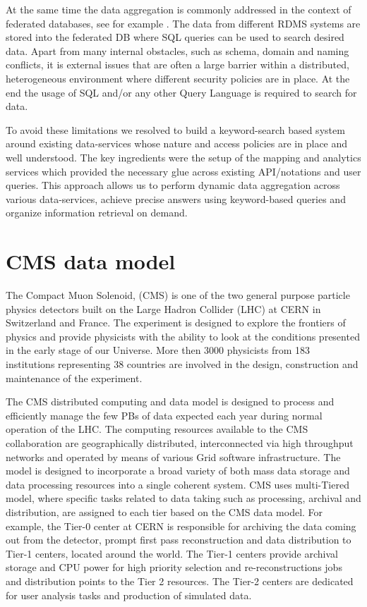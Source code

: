 \documentclass[1p,times]{elsarticle}
\begin{document}
At the same time the data aggregation is commonly addressed in the context of
federated databases, see for example \cite{FedDB}. The data from different 
RDMS systems are stored into the federated DB where SQL queries can be used to 
search desired data. Apart from many internal obstacles, such as
schema, domain and naming conflicts, it is external issues that are often
a large barrier within a distributed, heterogeneous environment where
different security policies are in place. At the end the usage of SQL and/or
any other Query Language is required to search for data.

To avoid these limitations we resolved to build a keyword-search based system around
existing data-services whose nature and access policies are in place and well understood.
The key ingredients were the setup of the mapping and analytics services which provided
the necessary glue across existing API/notations and user queries. This approach 
allows us to perform dynamic data aggregation across various data-services, achieve
precise answers using keyword-based queries
and organize information retrieval on demand.

\section{CMS data model\label{DataModel}}
The Compact Muon Solenoid, (CMS) \cite{CMS} 
is one of the two general purpose particle physics detectors built on 
the Large Hadron Collider (LHC) at CERN in Switzerland and France. 
The experiment is designed to explore the frontiers of physics and provide physicists
with the ability to look at the conditions presented in the early stage of our Universe.
More then 3000 physicists from 183 institutions representing 38 countries 
are involved in the design, construction and maintenance of the experiment.

The CMS distributed computing and data model \cite{CMSDataModel} 
is designed to process and efficiently manage the few PBs of data expected each year
during normal operation of the LHC. The computing resources available to the CMS
collaboration are geographically distributed, 
interconnected via high throughput networks and operated by means 
of various Grid software infrastructure. The model is designed to
incorporate a broad variety of both mass data storage and data processing
resources into a single coherent system. CMS uses
multi-Tiered model, where specific tasks related to data taking such as
processing, archival and distribution, are assigned to each tier based
on the CMS data model. For example, the Tier-0 center at CERN is responsible
for archiving the data coming out from the detector, prompt first pass reconstruction
and data distribution to Tier-1 centers, located around the world.
The Tier-1 centers provide archival storage and CPU power for high
priority selection and re-reconstructions jobs and distribution points
to the Tier 2 resources.
The Tier-2 centers are dedicated for user analysis tasks and production of simulated data.
\end{document}
